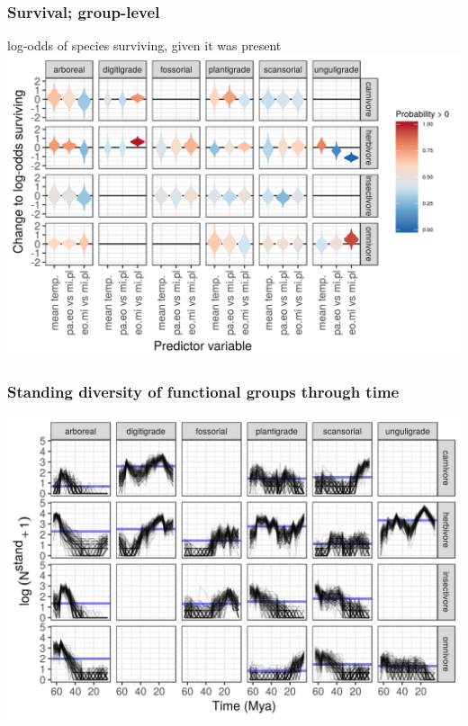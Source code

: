 \documentclass[aspectratio=169]{beamer}
\begin{document}
\begin{frame}
  \frametitle{Survival; group-level}
  \begin{center}
    log-odds of species surviving, given it was present
    \includegraphics[height=0.775\textheight,width=\textwidth,keepaspectratio=true]{figure/group_on_survival_bd}
  \end{center}
\end{frame}

\begin{frame}
  \frametitle{Standing diversity of functional groups through time}
  \begin{center}
    \includegraphics[height=0.8\textheight,width=\textwidth,keepaspectratio=true]{figure/ecotype_diversity}
  \end{center}
\end{frame}
\end{document}

